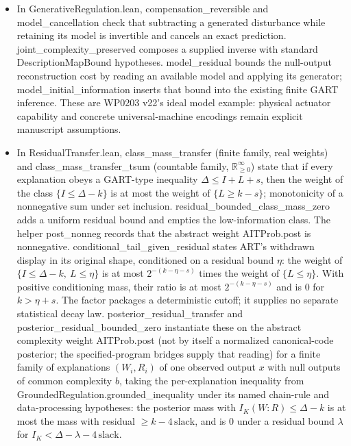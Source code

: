 \documentclass[11pt,a4paper]{article}
\newcommand{\lean}[1]{{\ttfamily\small
  \let\leanunderscore\_\def\_{\leanunderscore\allowbreak}#1}}
\begin{document}
\begin{itemize}[leftmargin=1.4em,itemsep=1pt]
horizons are paper-level obligations.
\item In \lean{GenerativeRegulation.lean}, \lean{compensation\_reversible} and
\lean{model\_cancellation} check that subtracting a generated disturbance while retaining
its model is invertible and cancels an exact prediction. \lean{joint\_complexity\_preserved}
composes a supplied inverse with standard \lean{DescriptionMapBound} hypotheses.
\lean{model\_residual} bounds the null-output reconstruction cost by reading an available
model and applying its generator; \lean{model\_initial\_information} inserts that bound
into the existing finite GART inference. These are WP0203 v22's ideal model example:
physical actuator capability and concrete universal-machine encodings remain explicit
manuscript assumptions.
\item In \lean{ResidualTransfer.lean}, \lean{class\_mass\_transfer} (finite family, real
weights) and \lean{class\_mass\_transfer\_tsum} (countable family, $\mathbb{R}_{\ge0}^{\infty}$)
state that if every explanation obeys a GART-type inequality $\Delta\le I+L+s$, then the
weight of the class $\{I\le\Delta-k\}$ is at most the weight of $\{L\ge k-s\}$; monotonicity
of a nonnegative sum under set inclusion. \lean{residual\_bounded\_class\_mass\_zero} adds a
uniform residual bound and empties the low-information class.
The helper \lean{post\_nonneg} records that the abstract weight \lean{AITProb.post} is nonnegative.
\lean{conditional\_tail\_given\_residual} states ART's withdrawn display in its original shape,
conditioned on a residual bound $\eta$: the weight of $\{I\le\Delta-k,\ L\le\eta\}$ is at most
$2^{-(k-\eta-s)}$ times the weight of $\{L\le\eta\}$. With positive conditioning mass,
their ratio is at most $2^{-(k-\eta-s)}$ and is $0$ for $k>\eta+s$.
The factor packages a deterministic cutoff; it supplies no separate statistical decay law.
\lean{posterior\_residual\_transfer} and \lean{posterior\_residual\_bounded\_zero} instantiate
these on the abstract complexity weight \lean{AITProb.post} (not by itself a normalized canonical-code posterior; the specified-program bridges supply that reading) for a finite family of explanations
$(W_i,R_i)$ of one observed output $x$ with null outputs of common complexity $b$, taking the
per-explanation inequality from \lean{GroundedRegulation.grounded\_inequality} under its named
chain-rule and data-processing hypotheses: the posterior mass with $I_K(W{:}R)\le\Delta-k$ is at
most the mass with residual $\ge k-4\,\mathrm{slack}$, and is $0$ under a residual bound
$\lambda$ for $I_K<\Delta-\lambda-4\,\mathrm{slack}$.

\end{itemize}
\end{document}
